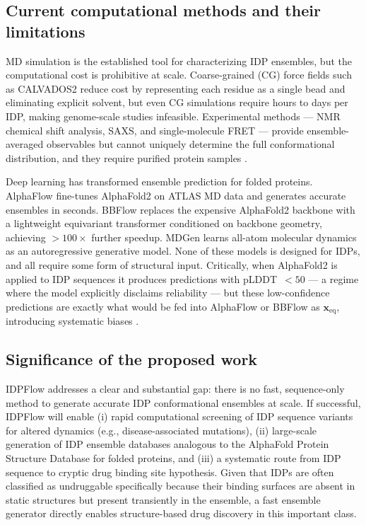 \documentclass[12pt]{article}
\begin{document}
\subsection{Current computational methods and their limitations}

MD simulation is the established tool for characterizing IDP ensembles, but the computational
cost is prohibitive at scale.
Coarse-grained (CG) force fields such as CALVADOS2 \cite{lohr2022calvados2} reduce cost
by representing each residue as a single bead and eliminating explicit solvent, but even
CG simulations require hours to days per IDP, making genome-scale studies infeasible.
Experimental methods --- NMR chemical shift analysis, SAXS, and single-molecule FRET --- provide
ensemble-averaged observables but cannot uniquely determine the full conformational
distribution, and they require purified protein samples \cite{mittag2007idp_nmr}.

Deep learning has transformed ensemble prediction for folded proteins.
AlphaFlow \cite{jing2024alphaflow} fine-tunes AlphaFold2 on ATLAS MD data
\cite{vander2023atlas} and generates accurate ensembles in seconds.
BBFlow \cite{wolf2025bbflow} replaces the expensive AlphaFold2 backbone with a lightweight
equivariant transformer conditioned on backbone geometry, achieving $>100\times$ further
speedup.
MDGen \cite{arts2023mdgen} learns all-atom molecular dynamics as an autoregressive
generative model.
None of these models is designed for IDPs, and all require some form of structural input.
Critically, when AlphaFold2 is applied to IDP sequences it produces predictions with
pLDDT~$<50$ --- a regime where the model explicitly disclaims reliability --- but these
low-confidence predictions are exactly what would be fed into AlphaFlow or BBFlow as
$\mathbf{x}_\mathrm{eq}$, introducing systematic biases \cite{ruff2021af2idp}.

\subsection{Significance of the proposed work}

IDPFlow addresses a clear and substantial gap: there is no fast, sequence-only method to
generate accurate IDP conformational ensembles at scale.
If successful, IDPFlow will enable (i) rapid computational screening of IDP sequence variants
for altered dynamics (e.g., disease-associated mutations), (ii) large-scale generation of IDP
ensemble databases analogous to the AlphaFold Protein Structure Database for folded proteins,
and (iii) a systematic route from IDP sequence to cryptic drug binding site hypothesis.
Given that IDPs are often classified as undruggable specifically because their binding
surfaces are absent in static structures but present transiently in the ensemble, a fast
ensemble generator directly enables structure-based drug discovery in this important class.
\end{document}
